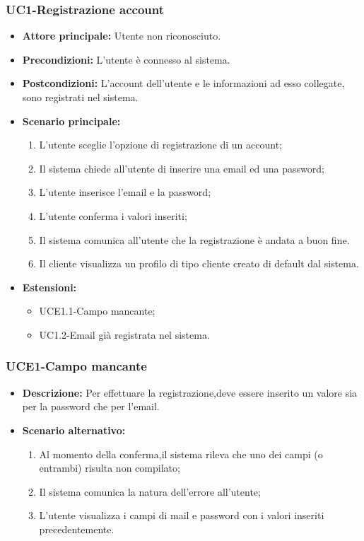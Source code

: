 \subsubsection{UC1-Registrazione account}
\begin{itemize}
    \item \textbf{Attore principale: }Utente non riconosciuto.
    \item \textbf{Precondizioni: }L'utente è connesso al sistema.
    \item \textbf{Postcondizioni: }L'account dell'utente e le informazioni ad esso collegate, sono registrati nel sistema.
    \item \textbf{Scenario principale:}
        \begin{enumerate}
            \item L'utente sceglie l'opzione di registrazione di un account;
            \item Il sistema chiede all'utente di inserire una email ed una password;
            \item L'utente inserisce l'email e la password;
            \item L'utente conferma i valori inseriti;
            \item Il sistema comunica all'utente che la registrazione è andata
            a buon fine.
            \item Il cliente visualizza un profilo di tipo cliente creato di default dal sistema.
        \end{enumerate}
    \item \textbf{Estensioni:}
        \begin{itemize}
                \item UCE1.1-Campo mancante;
                \item UC1.2-Email già registrata nel sistema.
        \end{itemize}
\end{itemize}

\subsubsection{UCE1-Campo mancante}
\begin{itemize}
    \item \textbf{Descrizione: }Per effettuare la registrazione,deve essere inserito un valore sia per la password che per l'email.
    \item \textbf{Scenario alternativo:}
    \begin{enumerate}
        \item Al momento della conferma,il sistema rileva che uno dei campi (o entrambi) risulta non compilato;
        \item Il sistema comunica la natura dell'errore all'utente;
        \item L'utente visualizza i campi di mail e password con i valori inseriti precedentemente.
    \end{enumerate}
\end{itemize}

